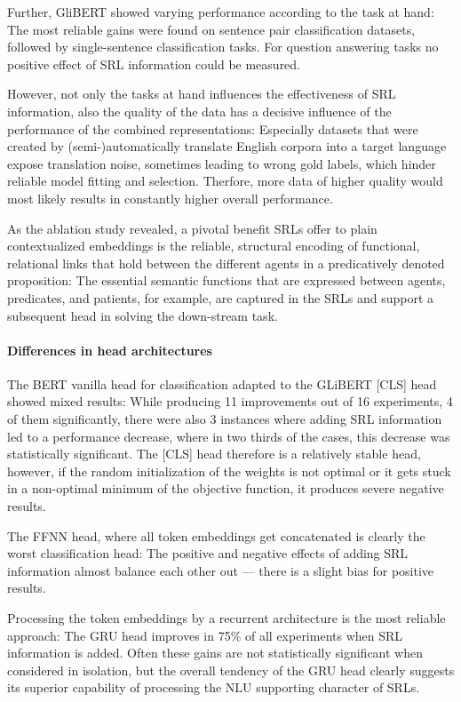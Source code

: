 {Further, GliBERT showed varying performance according to the task at hand: The most reliable
gains were found on sentence pair classification datasets, followed
by single-sentence classification tasks. For question answering tasks no positive
effect of SRL information could be measured.

However, not only the tasks at hand influences the effectiveness of SRL information,
also the quality of the data has a decisive influence of the performance of the
combined representations: Especially datasets that were created by (semi-)automatically
translate English corpora into a target language expose translation noise, sometimes
leading to wrong gold labels, which hinder reliable model fitting and selection. Therfore,
more data of higher quality would most likely results in constantly higher overall performance.

As the ablation study revealed, a pivotal benefit SRLs offer to plain contextualized embeddings is
the reliable, structural encoding of functional, relational links that hold between the different
agents in a predicatively denoted proposition: The essential semantic functions that are expressed
between agents, predicates, and patients, for example, are captured in the SRLs and support a
subsequent head in solving the down-stream task.


\paragraph*{Differences in head architectures}

The BERT vanilla head for classification adapted to the GLiBERT [CLS] head showed mixed results:
While producing 11 improvements out of 16 experiments, 4 of them significantly, there were also
3 instances where adding SRL information led to a performance decrease, where in two thirds of
the cases, this decrease was statistically significant. The [CLS] head therefore is a relatively
stable head, however, if the random initialization of the weights is not optimal or it gets stuck
in a non-optimal minimum of the objective function, it produces severe negative results.

The FFNN head, where all token embeddings get concatenated is clearly the worst classification
head: The positive and negative effects of adding SRL information almost balance each other out
--- there is a slight bias for positive results.

Processing the token embeddings by a recurrent architecture is the most reliable approach: The GRU
head improves in 75\% of all experiments when SRL information is added. Often these gains are not
statistically significant when considered in isolation, but the overall tendency of the GRU head
clearly suggests its superior capability of processing the NLU supporting character of SRLs.

}
